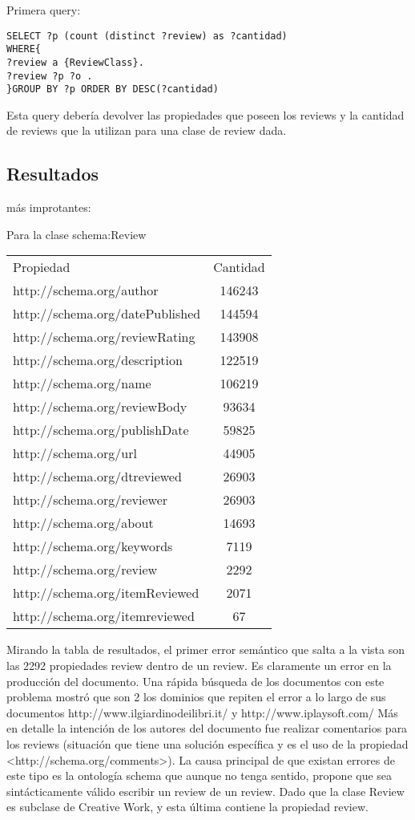 Primera query:

\begin{lstlisting}[frame=single]
SELECT ?p (count (distinct ?review) as ?cantidad) 
WHERE{
?review a {ReviewClass}.
?review ?p ?o .
}GROUP BY ?p ORDER BY DESC(?cantidad)
\end{lstlisting}

Esta query debería devolver las propiedades que poseen los reviews y la cantidad de reviews que la utilizan para una clase de review dada.

\subsection*{Resultados} más improtantes:

Para la clase schema:Review\\
\begin{tabular}{| l | c | }
 Propiedad & Cantidad \\
 http://schema.org/author & 146243 \\
 http://schema.org/datePublished & 144594 \\
 http://schema.org/reviewRating & 143908 \\
 http://schema.org/description & 122519 \\
 http://schema.org/name & 106219 \\
 http://schema.org/reviewBody & 93634 \\
 http://schema.org/publishDate & 59825 \\
 http://schema.org/url & 44905 \\
 http://schema.org/dtreviewed & 26903 \\
 http://schema.org/reviewer & 26903 \\
 http://schema.org/about & 14693 \\
 http://schema.org/keywords & 7119 \\
 http://schema.org/review & 2292 \\
 http://schema.org/itemReviewed & 2071 \\
 http://schema.org/itemreviewed & 67 
\end{tabular}

 Mirando la tabla de resultados, el primer error semántico que salta a la vista son las 2292 propiedades review dentro de un review. 
 Es claramente un error en la producción del documento. 
 Una rápida búsqueda de los documentos con este problema mostró que son 2 los dominios que repiten el error a lo largo de sus documentos
 http://www.ilgiardinodeilibri.it/ y http://www.iplaysoft.com/
 Más en detalle la intención de los autores del documento fue realizar comentarios para los reviews (situación que tiene una solución específica 
 y es el uso de la propiedad <http://schema.org/comments>). 
 La causa principal de que existan errores de este tipo es la ontología schema que aunque no tenga sentido, propone que sea sintácticamente válido
 escribir un review de un review. Dado que la clase Review es subclase de Creative Work, y esta última contiene la propiedad review.
 
